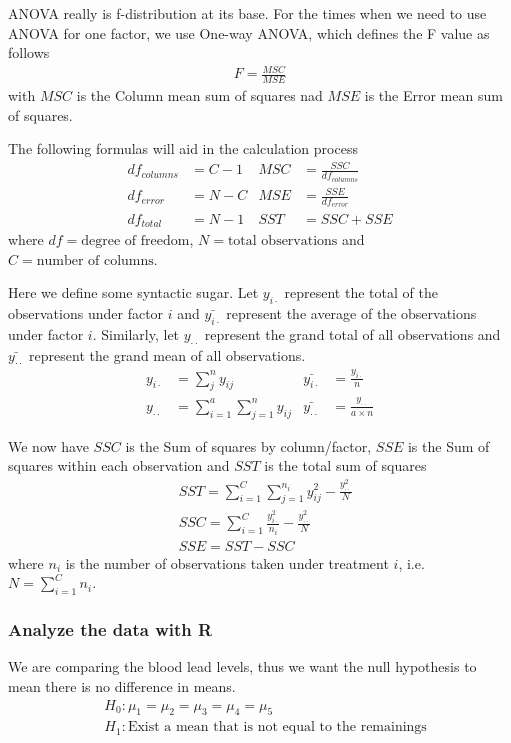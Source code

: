 \documentclass[a4paper]{article}
\numberwithin{equation}{section}
\begin{document}
ANOVA really is f-distribution at its base.
For the times when we need to use ANOVA for one factor, we use One-way ANOVA, which defines the F value as follows
\begin{align*}
  F = \frac{MSC}{MSE}
\end{align*}
with \(MSC\) is the Column mean sum of squares nad \(MSE\) is the Error mean sum of squares.

The following formulas will aid in the calculation process
\begin{align*}
  df_{columns} & = C - 1 & MSC & = \frac{SSC}{df_{columns}} \\
  df_{error}   & = N - C & MSE & = \frac{SSE}{df_{error}}   \\
  df_{total}   & = N-1   & SST & = SSC+SSE
\end{align*}
where \(df = \text{degree of freedom}\), \(N = \text{total observations}\) and \(C = \text{number of columns}\).

Here we define some syntactic sugar. Let \(y_{i\cdot}\) represent the total of the observations under factor \(i\) and \(\bar{y_{i\cdot}}\) represent the average of the observations under factor \(i\).
Similarly, let \(y_{\cdot\cdot}\) represent the grand total of all observations and \(\bar{y_{\cdot\cdot}}\) represent the grand mean of all observations.
\begin{align*}
  y_{i\cdot}     & = \sum_{j}^{n} y_{ij}                  & \bar{y_{i\cdot}}     & = \frac{y_{i\cdot}}{n}              \\
  y_{\cdot\cdot} & = \sum_{i=1}^{a} \sum_{j=1}^{n} y_{ij} & \bar{y_{\cdot\cdot}} & = \frac{y_{\cdot\cdot}}{a \times n}
\end{align*}

We now have \(SSC\) is the Sum of squares by column/factor, \(SSE\) is the Sum of squares within each observation and \(SST\) is the total sum of squares
\begin{align*}
   & SST = \sum_{i=1}^{C} \sum_{j=1}^{n_i} y_{ij}^2 - \frac{y_{\cdot\cdot}^2}{N}  \\
   & SSC = \sum_{i=1}^{C} \frac{y_{i\cdot}^{2}}{n_i} - \frac{y_{\cdot\cdot}^2}{N} \\
   & SSE = SST - SSC
\end{align*}
where \(n_i\) is the number of observations taken under treatment \(i\), i.e. \(N = \sum_{i=1}^{C} n_i\).

\subsubsection{Analyze the data with R}
We are comparing the blood lead levels, thus we want the null hypothesis to mean there is no difference in means.
\begin{align*}
   & H_0: \mu_1 = \mu_2 = \mu_3 = \mu_4 = \mu_5                  \\
   & H_1: \text{Exist a mean that is not equal to the remainings}
\end{align*}
\end{document}
